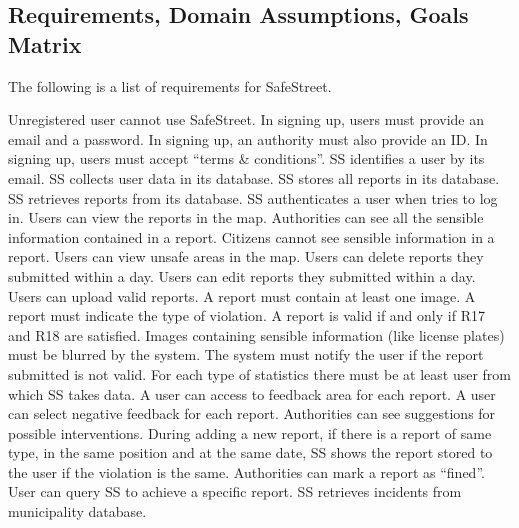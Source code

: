 \documentclass[../RASD.tex]{subfiles}
\begin{document}
            \subsection{Requirements, Domain Assumptions, Goals Matrix}\label{subsec:requirements,-domain-assumptions,-goals-matrix}
                The following is a list of requirements for SafeStreet.
                \begin{enumerate}
                     Unregistered user cannot use SafeStreet.
                     In signing up, users must provide an email and a password.
                     In signing up, an authority must also provide an ID.
                     In signing up, users must accept “terms \& conditions”.
                     SS identifies a user by its email.
                     SS collects user data in its database.
                     SS stores all reports in its database.
                     SS retrieves reports from its database.
                     SS authenticates a user when tries to log in.
                     Users can view the reports in the map.
                     Authorities can see all the sensible information contained in a report.
                     Citizens cannot see sensible information in a report.
                     Users can view unsafe areas in the map.
                     Users can delete reports they submitted within a day.
                     Users can edit reports they submitted within a day.
                     Users can upload valid reports.
                     A report must contain at least one image.
                     A report must indicate the type of violation.
                     A report is valid if and only if R17 and R18 are satisfied.
                     Images containing sensible information (like license plates) must be blurred by the system.
                     The system must notify the user if the report submitted is not valid.
                     For each type of statistics there must be at least user from which SS takes data.
                     A user can access to feedback area for each report.
                     A user can select negative feedback for each report.
                     Authorities can see suggestions for possible interventions.
                     During adding a new report, if there is a report of same type, in the same position and at the same date, SS shows the report stored to the user if the violation is the same.
                     Authorities can mark a report as “fined”.
                     User can query SS to achieve a specific report.
                     SS retrieves incidents from municipality database.
                \end{enumerate}
\end{document}
